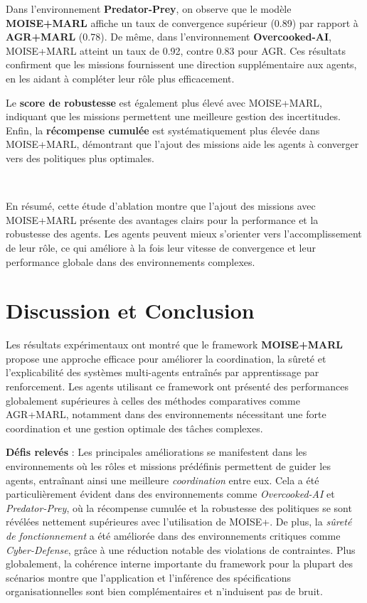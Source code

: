\documentclass[sigconf,anonymous]{aamas}
\begin{document}
Dans l'environnement \textbf{Predator-Prey}, on observe que le modèle \textbf{MOISE+MARL} affiche un taux de convergence supérieur (0.89) par rapport à \textbf{AGR+MARL} (0.78). De même, dans l'environnement \textbf{Overcooked-AI}, MOISE+MARL atteint un taux de 0.92, contre 0.83 pour AGR. Ces résultats confirment que les missions fournissent une direction supplémentaire aux agents, en les aidant à compléter leur rôle plus efficacement.

Le \textbf{score de robustesse} est également plus élevé avec MOISE+MARL, indiquant que les missions permettent une meilleure gestion des incertitudes. Enfin, la \textbf{récompense cumulée} est systématiquement plus élevée dans MOISE+MARL, démontrant que l'ajout des missions aide les agents à converger vers des politiques plus optimales.

\

En résumé, cette étude d'ablation montre que l'ajout des missions avec MOISE+MARL présente des avantages clairs pour la performance et la robustesse des agents. Les agents peuvent mieux s'orienter vers l'accomplissement de leur rôle, ce qui améliore à la fois leur vitesse de convergence et leur performance globale dans des environnements complexes.


\section{Discussion et Conclusion}
\label{sec:discussion_conclusion}


Les résultats expérimentaux ont montré que le framework \textbf{MOISE+MARL} propose une approche efficace pour améliorer la coordination, la sûreté et l'explicabilité des systèmes multi-agents entraînés par apprentissage par renforcement. Les agents utilisant ce framework ont présenté des performances globalement supérieures à celles des méthodes comparatives comme AGR+MARL, notamment dans des environnements nécessitant une forte coordination et une gestion optimale des tâches complexes.

\textbf{Défis relevés} : Les principales améliorations se manifestent dans les environnements où les rôles et missions prédéfinis permettent de guider les agents, entraînant ainsi une meilleure \textit{coordination} entre eux. Cela a été particulièrement évident dans des environnements comme \textit{Overcooked-AI} et \textit{Predator-Prey}, où la récompense cumulée et la robustesse des politiques se sont révélées nettement supérieures avec l'utilisation de MOISE+. De plus, la \textit{sûreté de fonctionnement} a été améliorée dans des environnements critiques comme \textit{Cyber-Defense}, grâce à une réduction notable des violations de contraintes. Plus globalement, la cohérence interne importante du framework pour la plupart des scénarios montre que l'application et l'inférence des spécifications organisationnelles sont bien complémentaires et n'induisent pas de bruit.
\end{document}
